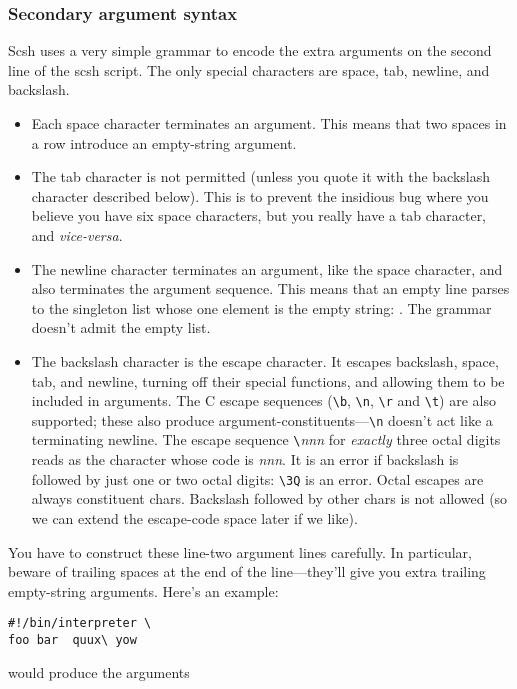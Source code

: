\subsubsection{Secondary argument syntax}
Scsh uses a very simple grammar to encode the extra arguments on 
the second line of the scsh script.
The only special characters are space, tab, newline, and backslash.
\begin{itemize}
\item Each space character terminates an argument.
    This means that two spaces in a row introduce an empty-string argument.

\item The tab character is not permitted 
    (unless you quote it with the backslash character described below).
    This is to prevent the insidious bug where you believe you have
    six space characters, but you really have a tab character, 
    and \emph{vice-versa}.

\item The newline character terminates an argument, like the space character,
      and also terminates the argument sequence.
      This means that an empty line parses to the singleton list whose one
      element is the empty string: . 
      The grammar doesn't admit the empty list.

\item The backslash character is the escape character.
    It escapes backslash, space, tab, and newline, turning off their
    special functions, and allowing them to be included in arguments.
    The {\Ansi} C escape sequences (\verb|\b|, \verb|\n|, \verb|\r|
    and \verb|\t|) are also supported; 
    these also produce argument-constituents---\verb|\n| doesn't act 
    like a terminating newline. 
    The escape sequence \verb|\|\emph{nnn} for \emph{exactly} three
    octal digits reads as the character whose {\Ascii} code is \emph{nnn}.
    It is an error if backslash is followed by just one or two octal digits:
    \verb|\3Q| is an error. 
    Octal escapes are always constituent chars. 
    Backslash followed by other chars is not allowed 
    (so we can extend the escape-code space later if we like).
\end{itemize}

You have to construct these line-two argument lines carefully.
In particular, beware of trailing spaces at the end of the line---they'll
give you extra trailing empty-string arguments.
Here's an example:
%
\begin{inset}
\begin{verbatim}
#!/bin/interpreter \
foo bar  quux\ yow\end{verbatim}
\end{inset}
%
would produce the arguments
%

